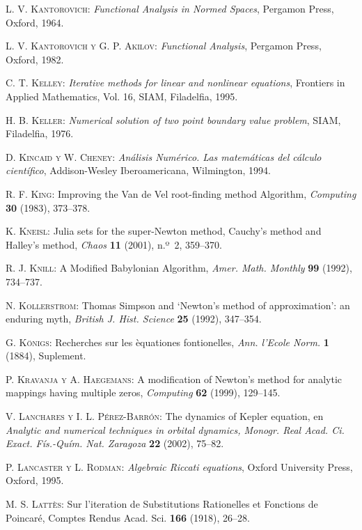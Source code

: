 \begin{thebibliography}{999}
\textsc{L. V. Kantorovich}:
\textit{Functional Analysis  in Normed Spaces},
Pergamon Press, Oxford, 1964.

\textsc{L. V. Kantorovich y G. P. Akilov}:
\textit{Functional Analysis},
Pergamon Press, Oxford, 1982.


\textsc{C. T.  Kelley}:
\textit{Iterative methods for linear and nonlinear equations},
Frontiers in Applied Mathematics, Vol. 16, SIAM, Filadelfia, 1995.

 \textsc{H. B. Keller}:
\textit{Numerical solution of two point boundary value problem}, SIAM,
Filadelfia, 1976.

\textsc{D. Kincaid y W. Cheney}:
\textit{Análisis Numérico. Las matemáticas del cálculo científico},
Addison-Wesley Iberoamericana, Wilmington, 1994.

\textsc{R. F. King}:
{Improving the Van de Vel root-finding method Algorithm},
\textit{Computing} \textbf{30} (1983),   373--378.

\textsc{K. Kneisl}:
Julia sets for the super-Newton method, Cauchy's method and Halley's method,
\textit{Chaos}  \textbf{11} (2001), n.º~2, 359--370.

\textsc{R. J. Knill}:
{A Modified Babylonian Algorithm},
\textit{Amer. Math. Monthly} \textbf{99} (1992),   734--737.

\textsc{N. Kollerstrom}:
Thomas Simpson and `Newton's method of approximation': an enduring myth,
\textit{British J. Hist.  Science} \textbf{25} (1992), 347--354.

\textsc{G. Königs}: {Recherches sur les \`equationes fontionelles},
\textit{Ann. l'Ecole Norm.} \textbf{1} (1884), Suplement.

\textsc{P. Kravanja y A. Haegemans}:
{A modification of Newton's method for analytic mappings having multiple zeros},
\textit{Computing} \textbf{62} (1999),  129--145.

\textsc{V. Lanchares y I. L. Pérez-Barrón}:
The dynamics of Kepler equation, en
\textit{Analytic and numerical techniques in orbital dynamics, Monogr. Real Acad. Ci. Exact. Fís.-Quím. Nat. Zaragoza} \textbf{22} (2002), 75--82.

\textsc{P. Lancaster y L. Rodman}:
\textit{Algebraic Riccati equations},
Oxford University Press, Oxford, 1995.

\textsc{M. S. Lattès}:
{Sur l'iteration de Substitutions Rationelles et Fonctions de Poincaré},
Comptes Rendus Acad. Sci. \textbf{166} (1918), 26--28.


\end{thebibliography}
